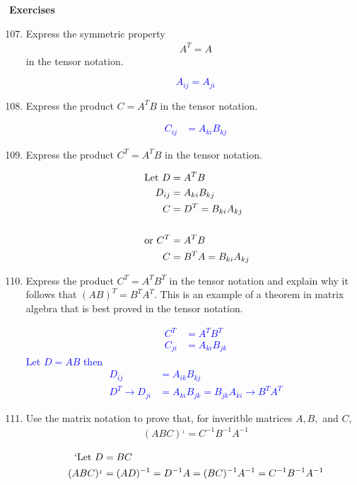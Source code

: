 \documentclass[12pt,a4paper]{report}
\newcommand{\BLUE}[1]{\textcolor{blue}{#1}}
\begin{document}
\HLINE
\textbf{Exercises}
\begin{enumerate}[label=\textbf{\arabic*.}]
\setcounter{enumi}{106}
\item Express the symmetric property
\begin{align*}
	A^T = A
\end{align*} in the tensor notation.

\BLUE{$$ A_{ij} = A_{ji}$$}

\item Express the product $C=A^TB$ in the tensor notation.

\BLUE{\begin{align*}
	C_{ij} &= A_{ki}B_{kj}
\end{align*}
}

\item Express the product $C^T=A^TB$ in the tensor notation.

\BLUE{\begin{align*}
	\text{Let } D &= A^TB\\
	D_{ij} &= A_{ki}B_{kj} \\
	C &= D^T = B_{ki}A_{kj} \\ \\
	\text{ or } C^T &= A^TB\\
	C &= B^TA = B_{ki}A_{kj}
\end{align*}
}

\item Express the product $C^T=A^TB^T$ in the tensor notation and explain why it follows that $(AB)^T = B^TA^T$.  This is an example of a theorem in matrix algebra that is best proved in the tensor notation.

\BLUE{\begin{align*}
	C^T &= A^TB^T \\
	C_{ji} &= A_{ki}B_{jk} 
\end{align*}Let $D = AB$ then 
\begin{align*}
	D_{ij} &= A_{ik}B_{kj} \\
	D^T \to D_{ji} &= A_{ki}B_{jk} = B_{jk}A_{ki} \to B^TA^T
\end{align*}
}

\item Use the matrix notation to prove that, for inveritble matrices $A, B,$ and $C$,
\begin{align*}
	(ABC)^{_1}=C^{-1}B^{-1}A^{-1}
\end{align*}

\BLUE{\begin{align*}
`	\text{Let } D &= BC \\
	(ABC)^{_1} &= (AD)^{-1} = D^{-1}A = (BC)^{-1}A^{-1} = C^{-1}B^{-1}A^{-1}
\end{align*}
}


\end{enumerate}
\end{document}
